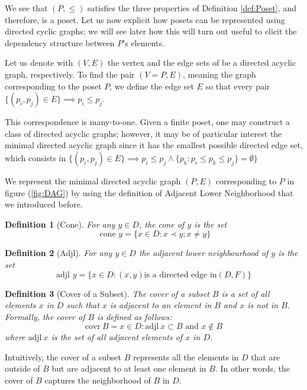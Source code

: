 \documentclass[11pt]{amsart}
\newtheorem{definition}{Definition}
\begin{document}
We see that $(P, \leq)$ satisfies the three properties of Definition \eqref{def:Poset}, and therefore, is a poset. Let us now explicit how posets can be represented using directed cyclic graphs; we will see later how this will turn out useful to elicit the dependency structure between $P$'s elements.

Let us denote with $(V, E)$ the vertex and the edge sets of be a directed acyclic graph, respectively. To find the pair $(V=P, E)$, meaning the graph corresponding to the poset $P$, we define the edge set $E$ so that every pair $\{(p_i, p_j) \in E \} \implies p_i \leq p_j$.

This correspondence is many-to-one. Given a finite poset, one may construct a class of directed acyclic graphs; however, it may be of particular interest the minimal directed acyclic graph since it has the smallest possible directed edge set, which consists in $\{(p_i, p_j) \in E \} \implies p_i \leq p_j \land \{p_k : p_i\leq p_k\leq p_j \} = \emptyset \}$

We represent the minimal directed acyclic graph $(P, E)$ corresponding to $P$ in figure (\ref{fig:DAG}) by using the definition of Adjacent Lower Neighborhood that we introduced before.


\begin{definition}[Cone]
For any $y \in D$, the \textit{cone} of $y$ is the set
\begin{equation}
\text{ cone } y = \{x \in D: x\prec y;x\neq y \} \nonumber
\end{equation}
\end{definition}

\begin{definition}[Adjl]
For any $y \in D$ the \textit{adjacent lower neighbourhood} of $y$ is the set $$
\text{adjl } y = \{ x \in D:(x,y) \text{is a directed edge in} (D,F)\}
$$
\end{definition}




\begin{definition}[Cover of a Subset]
The cover of a subset $B$ is a set of all elements $x$ in $D$ such that $x$ is adjacent to an element in $B$ and $x$ is not in $B$. Formally, the cover of $B$ is defined as follows:
\begin{equation}
\text{covr}\ B = { x \in D: \text{adjl}\ x \subset B \text{ and } x \notin B } \nonumber
\end{equation}
where $\text{adjl}\ x$ is the set of all adjacent elements of $x$ in $D$.
\end{definition}
Intuitively, the cover of a subset $B$ represents all the elements in $D$ that are outside of $B$ but are adjacent to at least one element in $B$. In other words, the cover of $B$ captures the neighborhood of $B$ in $D$.
\end{document}
